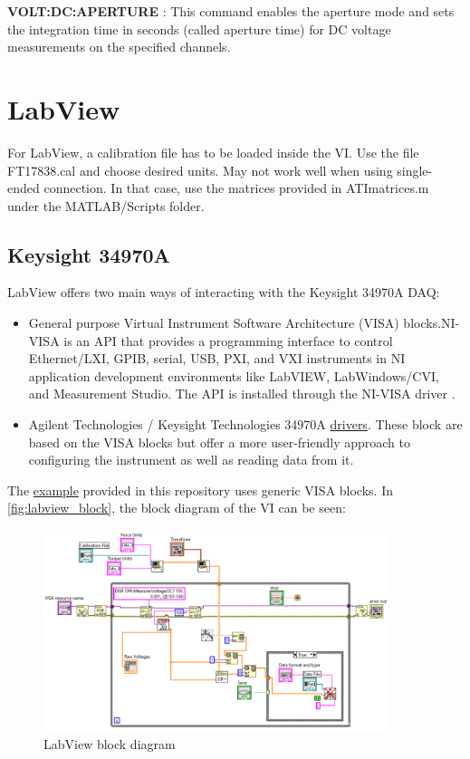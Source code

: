 \documentclass[a4paper]{article}
\begin{document}
\textbf{VOLT:DC:APERTURE} : This command enables the aperture mode and sets the integration time in seconds (called aperture time) for DC voltage measurements on the specified channels.


\section{LabView}

For LabView, a calibration file has to be loaded inside the VI. Use the file FT17838.cal and choose desired units. May not work well when using single-ended connection. In that case, use the matrices provided in ATImatrices.m under the MATLAB/Scripts folder.

\subsection{Keysight 34970A}

LabView offers two main ways of interacting with the Keysight 34970A DAQ:

\begin{itemize}
	\item General purpose Virtual Instrument Software Architecture (VISA) blocks.NI-VISA is an API that provides a programming interface to control Ethernet/LXI, GPIB, serial, USB, PXI, and VXI instruments in NI application development environments like LabVIEW, LabWindows/CVI, and Measurement Studio. The API is installed through the NI-VISA driver \cite{NIVISA}.
	\item Agilent Technologies / Keysight Technologies 34970A \hyperref{http://sine.ni.com/apps/utf8/niid_web_display.model_page?p_model_id=5547}{category}{name}{drivers}. These block are based on the VISA blocks but offer a more user-friendly approach to configuring the instrument as well as reading data from it. 
\end{itemize}

The \hyperref{https://github.com/IrisDuMutel/ATIMini40_software/tree/master/LabView}{cat1}{visa}{example}  provided in this repository uses generic VISA blocks. In \autoref{fig:labview_block}, the block diagram of the VI can be seen:

\begin{figure}[!h]
	\centering
	\includegraphics[width=0.9\textwidth]{labview_block.png}
	\caption{LabView block diagram}
	\label{fig:labview_block}
\end{figure}
\end{document}
